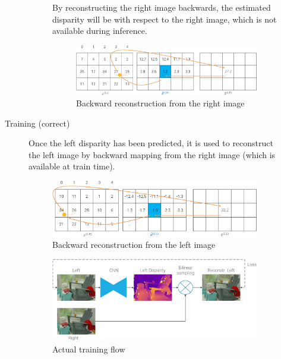 \begin{description}
\begin{description}
\begin{description}
                        \begin{remark}
                            By reconstructing the right image backwards, the estimated disparity will be with respect to the right image, which is not available during inference.
                        \end{remark}

                        \begin{figure}[H]
                            \centering
                            \includegraphics[width=0.65\linewidth]{./img/_monodepth_train_naive.pdf}
                            \caption{Backward reconstruction from the right image}
                        \end{figure}
                \end{description}

            \item[Training (correct)] 
                Once the left disparity has been predicted, it is used to reconstruct the left image by backward mapping from the right image (which is available at train time).

                \begin{figure}[H]
                    \centering
                    \includegraphics[width=0.65\linewidth]{./img/_monodepth_train_correct.pdf}
                    \caption{Backward reconstruction from the left image}
                \end{figure}

                \begin{figure}[H]
                    \centering
                    \includegraphics[width=0.7\linewidth]{./img/_monodepth_correct.pdf}
                    \caption{Actual training flow}
                \end{figure}


\end{description}
\end{description}
